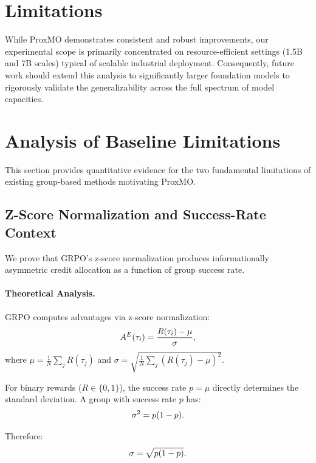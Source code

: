 \documentclass[11pt]{article}
\begin{document}
\newpage

\section*{Limitations}
While ProxMO demonstrates consistent and robust improvements, our experimental scope is primarily concentrated on resource-efficient settings (1.5B and 7B scales) typical of scalable industrial deployment. Consequently, future work should extend this analysis to significantly larger foundation models to rigorously validate the generalizability across the full spectrum of model capacities.



\appendix

\section{Analysis of Baseline Limitations}
\label{sec:appendix_baseline_analysis}

This section provides quantitative evidence for the two fundamental limitations of existing group-based methods motivating ProxMO.

\subsection{Z-Score Normalization and Success-Rate Context}
\label{sec:appendix_zscore_analysis}

We prove that GRPO's z-score normalization produces informationally asymmetric credit allocation as a function of group success rate.

\paragraph{Theoretical Analysis.}
GRPO computes advantages via z-score normalization:
\begin{equation}
\small
A^E(\tau_i) = \frac{R(\tau_i) - \mu}{\sigma},
\end{equation}
where $\mu = \frac{1}{N}\sum_j R(\tau_j)$ and $\sigma = \sqrt{\frac{1}{N}\sum_j (R(\tau_j) - \mu)^2}$.

For binary rewards ($R \in \{0, 1\}$), the success rate $p = \mu$ directly determines the standard deviation. A group with success rate $p$ has:
\begin{equation}
\small
\sigma^2 = p(1-p).
\end{equation}

Therefore:
\begin{equation}
\small
\sigma = \sqrt{p(1-p)}.
\end{equation}
\end{document}
